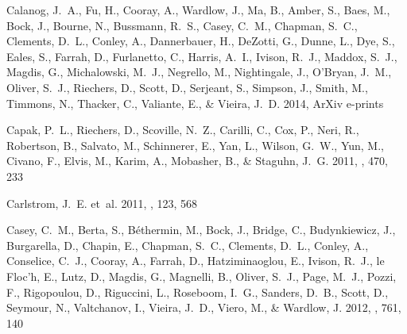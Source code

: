 \documentclass[iop]{emulateapj}
\begin{document}
\begin{thebibliography}{107}
{Calanog}, J.~A., {Fu}, H., {Cooray}, A., {Wardlow}, J., {Ma}, B., {Amber}, S.,
  {Baes}, M., {Bock}, J., {Bourne}, N., {Bussmann}, R.~S., {Casey}, C.~M.,
  {Chapman}, S.~C., {Clements}, D.~L., {Conley}, A., {Dannerbauer}, H.,
  {DeZotti}, G., {Dunne}, L., {Dye}, S., {Eales}, S., {Farrah}, D.,
  {Furlanetto}, C., {Harris}, A.~I., {Ivison}, R.~J., {Maddox}, S.~J.,
  {Magdis}, G., {Michalowski}, M.~J., {Negrello}, M., {Nightingale}, J.,
  {O'Bryan}, J.~M., {Oliver}, S.~J., {Riechers}, D., {Scott}, D., {Serjeant},
  S., {Simpson}, J., {Smith}, M., {Timmons}, N., {Thacker}, C., {Valiante}, E.,
  \& {Vieira}, J.~D. 2014, ArXiv e-prints

{Capak}, P.~L., {Riechers}, D., {Scoville}, N.~Z., {Carilli}, C., {Cox}, P.,
  {Neri}, R., {Robertson}, B., {Salvato}, M., {Schinnerer}, E., {Yan}, L.,
  {Wilson}, G.~W., {Yun}, M., {Civano}, F., {Elvis}, M., {Karim}, A.,
  {Mobasher}, B., \& {Staguhn}, J.~G. 2011, \nat, 470, 233

{Carlstrom}, J.~E. {et~al.} 2011, \pasp, 123, 568

{Casey}, C.~M., {Berta}, S., {B{\'e}thermin}, M., {Bock}, J., {Bridge}, C.,
  {Budynkiewicz}, J., {Burgarella}, D., {Chapin}, E., {Chapman}, S.~C.,
  {Clements}, D.~L., {Conley}, A., {Conselice}, C.~J., {Cooray}, A., {Farrah},
  D., {Hatziminaoglou}, E., {Ivison}, R.~J., {le Floc'h}, E., {Lutz}, D.,
  {Magdis}, G., {Magnelli}, B., {Oliver}, S.~J., {Page}, M.~J., {Pozzi}, F.,
  {Rigopoulou}, D., {Riguccini}, L., {Roseboom}, I.~G., {Sanders}, D.~B.,
  {Scott}, D., {Seymour}, N., {Valtchanov}, I., {Vieira}, J.~D., {Viero}, M.,
  \& {Wardlow}, J. 2012{}, \apj, 761, 140


\end{thebibliography}
\end{document}
